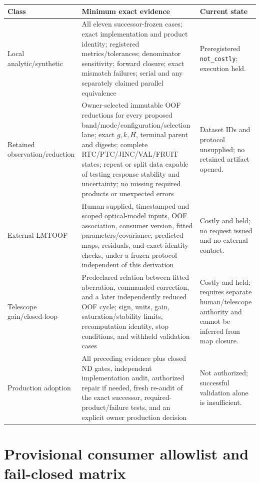 \documentclass[11pt]{article}
\begin{document}
\begin{longtable}{@{}L{0.18\textwidth}L{0.36\textwidth}L{0.37\textwidth}@{}}
\toprule
Class & Minimum exact evidence & Current state \\
\midrule
\endhead
Local analytic/synthetic & All eleven successor-frozen cases; exact
implementation and product identity; registered metrics/tolerances;
denominator sensitivity;
forward closure; exact mismatch failures; serial and any separately claimed
parallel equivalence & Preregistered \texttt{not\_costly}; execution held. \\
Retained observation/reduction & Owner-selected immutable OOF reductions for
every proposed band/mode/configuration/selection lane; exact $g,k,H$, terminal
parent and digests; complete RTC/PTC/JINC/VAL/FRUIT states; repeat or split data
capable of testing response stability and uncertainty; no missing required
products or unexpected errors & Dataset IDs and protocol unsupplied; no
retained artifact opened. \\
External LMTOOF & Human-supplied, timestamped and scoped optical-model inputs,
OOF association, consumer version, fitted parameters/covariance, predicted
maps, residuals, and exact identity checks, under a frozen protocol independent
of this derivation & Costly and held; no request issued and no external contact. \\
Telescope gain/closed-loop & Predeclared relation between fitted aberration,
commanded correction, and a later independently reduced OOF cycle; sign,
units, gain, saturation/stability limits, recomputation identity, stop
conditions, and withheld validation cases & Costly and held; requires separate
human/telescope authority and cannot be inferred from map closure. \\
Production adoption & All preceding evidence plus closed ND gates, independent
implementation audit, authorized repair if needed, fresh re-audit of the exact
successor, required-product/failure tests, and an explicit owner production
decision & Not authorized; successful validation alone is insufficient. \\
\bottomrule
\end{longtable}

\section{Provisional consumer allowlist and fail-closed matrix}
\end{document}
